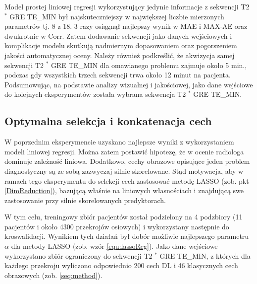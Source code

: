 \renewcommand{\arraystretch}{1}
Model prostej liniowej regresji wykorzystujący jedynie informacje z sekwencji T2 $^\ast$ GRE TE\_MIN był najskuteczniejszy w największej liczbie mierzonych parametrów tj. 8 z 18. 3 razy osiągnął najlepszy wynik w MAE i MAX-AE oraz dwukrotnie w Corr. Zatem dodawanie sekwencji jako danych wejściowych i komplikacje modelu skutkują nadmiernym dopasowaniem oraz pogorszeniem jakości automatycznej oceny. Należy również podkreślić, że akwizycja samej sekwencji T2 $^\ast$ GRE TE\_MIN dla omawianego problemu zajmuje około 5 min., podczas gdy wszystkich trzech sekwencji trwa około 12 minut na pacjenta. Podsumowując, na podstawie analizy wizualnej i jakościowej, jako dane wejściowe do kolejnych eksperymentów została wybrana sekwencja T2 $^\ast$ GRE TE\_MIN. 

\subsection{Optymalna selekcja i konkatenacja cech}
\label{seq:fusion}
W poprzednim eksperymencie uzyskano najlepsze wyniki z wykorzystaniem modeli liniowej regresji. Można zatem postawić hipotezę, że w ocenie radiologa dominuje zależność liniowa. Dodatkowo, cechy obrazowe opisujące jeden problem diagnostyczny są ze sobą zazwyczaj silnie skorelowane. Stąd motywacja, aby w ramach tego eksperymentu do selekcji cech zastosować metodę LASSO (zob. pkt \ref{DimReduction}), bazującą właśnie na liniowych własnościach i znajdującą swe zastosowanie przy silnie skorelowanych predyktorach.  

W tym celu, treningowy zbiór pacjentów został podzielony na 4 podzbiory (11 pacjentów i około 4300 przekrojów osiowych) i wykorzystany następnie do kroswalidacji. Wynikiem tych działań był dobór możliwie najlepszego parametru $\alpha$ dla metody LASSO (zob. wzór \ref{equ:lassoReg}). Jako dane wejściowe wykorzystano zbiór ograniczony do sekwencji T2 $^\ast$ GRE TE\_MIN, z których dla każdego przekroju wyliczono odpowiednio 200 cech DL i 46 klasycznych cech obrazowych (zob. \ref{seq:method}).

